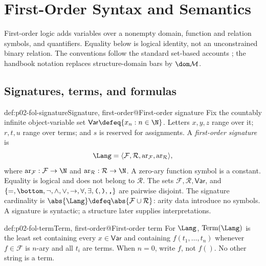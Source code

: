
\chapter{First-Order Syntax and Semantics}
\label{sec:p02-first-order-syntax-semantics}

First-order logic adds variables over a nonempty domain, function and relation
symbols, and quantifiers.  Equality below is logical identity, not an
unconstrained binary relation.  The conventions follow the standard set-based
accounts \cite{EbbinghausFlumThomas1994,Hodges1993,ChiswellHodges2007}; the
handbook notation replaces structure-domain bars by \(\dom\mathcal M\).

\section{Signatures, terms, and formulas}
\label{sec:p02-fol-grammar}

\begin{hbdefinition}{def:p02-fol-signature}{Signature, first-order@First-order signature}
Fix the countably infinite object-variable set
\(\mathsf{Var}\defeq\{x_n:n\in\N\}\).  Letters \(x,y,z\) range over it;
\(r,t,u\) range over terms; and \(s\) is reserved for assignments.  A
\emph{first-order signature} is
\[
 \Lang=\langle\mathcal F,\mathcal R,
       \operatorname{ar}_{\mathcal F},\operatorname{ar}_{\mathcal R}\rangle,
\]
where \(\operatorname{ar}_{\mathcal F}:\mathcal F\to\N\) and
\(\operatorname{ar}_{\mathcal R}:\mathcal R\to\N\).  A zero-ary function
symbol is a constant.  Equality is logical and does not belong to
\(\mathcal R\).  The sets \(\mathcal F,\mathcal R,\mathsf{Var}\), and
\(\{=,\bottom,\neg,\land,\lor,\to,\forall,\exists,
\texttt{(},\texttt{)},\texttt{,}\}\) are pairwise disjoint.
The signature cardinality is
\(\abs{\Lang}\defeq\abs{\mathcal F\cup\mathcal R}\): arity data introduce no
symbols.  A signature is syntactic; a structure later supplies
interpretations.
\end{hbdefinition}

\begin{hbdefinition}{def:p02-fol-term}{Term, first-order@First-order term}
For \(\Lang\), \(\operatorname{Term}(\Lang)\) is the least set containing
every \(x\in\mathsf{Var}\) and containing
\(f(t_1,\ldots,t_n)\) whenever \(f\in\mathcal F\) is \(n\)-ary and all
\(t_i\) are terms.  When \(n=0\), write \(f\), not \(f()\).  No other
string is a term.
\end{hbdefinition}

